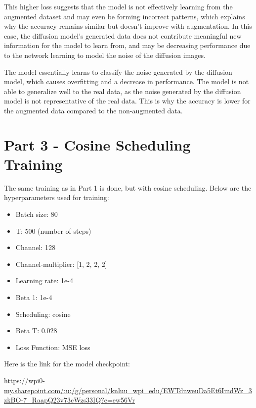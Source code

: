 \documentclass[conference]{IEEEtran}
\begin{document}
This higher loss suggests that the model is not effectively learning from the augmented dataset and may even be forming incorrect patterns, which explains why the accuracy remains similar but doesn't improve with augmentation. In this case, the diffusion model’s generated data does not contribute meaningful new information for the model to learn from, and may be decreasing performance due to the network learning to model the noise of the diffusion images.

The model essentially learns to classify the noise generated by the diffusion model, which causes overfitting and a decrease in performance. The model is not able to generalize well to the real data, as the noise generated by the diffusion model is not representative of the real data. This is why the accuracy is lower for the augmented data compared to the non-augmented data.


\section{Part 3 - Cosine Scheduling Training}
The same training as in Part 1 is done, but with cosine scheduling. Below are the hyperparameters used for training:
\begin{itemize}
  \item Batch size: 80
  \item T: 500 (number of steps)
  \item Channel: 128
  \item Channel-multiplier: [1, 2, 2, 2]
  \item Learning rate: 1e-4
  \item Beta 1: 1e-4
  \item Scheduling: cosine
  \item Beta T: 0.028
  \item Loss Function: MSE loss
\end{itemize}

Here is the link for the model checkpoint: 

\urldef{\cosine}\url{https://wpi0-my.sharepoint.com/:u:/g/personal/knluu_wpi_edu/EWTdnweuDa5Et6ImdWz_3zkBO-7_RaapQ23v73cWzs33IQ?e=ew56Vr}
\cosine{}
\end{document}
